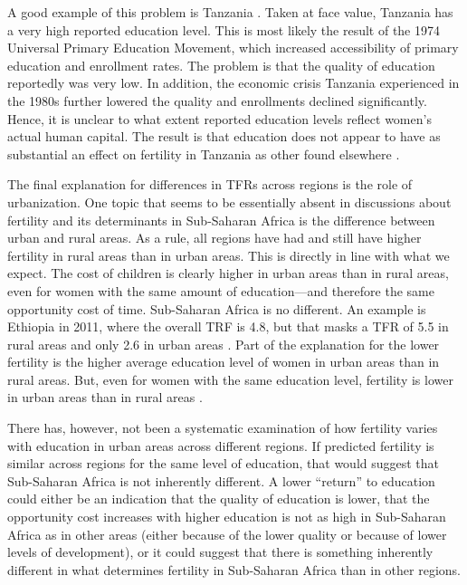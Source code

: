 \documentclass[]{article}
\begin{document}
A good example of this problem is Tanzania \citep{Galabawa2001,Wedgwood2005}. Taken at face value, Tanzania has a very high reported education level. This is most likely the result of the 1974 Universal Primary Education Movement, which increased accessibility of primary education and enrollment rates. The problem is that the quality of education reportedly was very low. In addition, the economic crisis Tanzania experienced in the 1980s further lowered the quality and enrollments declined significantly. Hence, it is unclear to what extent reported education levels reflect women's actual human capital. The result is that education does not appear to have as substantial an effect on fertility in Tanzania as other found elsewhere \citet{Alam2016}.

The final explanation for differences in TFRs across regions is the role of urbanization. One topic that seems to be essentially absent in discussions about fertility and its determinants in Sub-Saharan Africa is the difference between urban and rural areas. As a rule, all regions have had and still have higher fertility in rural areas than in urban areas. This is directly in line with what we expect. The cost of children is clearly higher in urban areas than in rural areas, even for women with the same amount of education---and therefore the same opportunity cost of time. Sub-Saharan Africa is no different. An example is Ethiopia in 2011, where the overall TRF is 4.8, but that masks a TFR of 5.5 in rural areas and only 2.6 in urban areas \citep{Central-Statistical-Agency/Ethiopia2012}. Part of the explanation for the lower fertility is the higher average education level of women in urban areas than in rural areas. But, even for women with the same education level, fertility is lower in urban areas than in rural areas \citep{Ainsworth1996}.

There has, however, not been a systematic examination of how fertility varies with education in urban areas across different regions. If predicted fertility is similar across regions for the same level of education, that would suggest that Sub-Saharan Africa is not inherently different. A lower ``return'' to education could either be an indication that the quality of education is lower, that the opportunity cost increases with higher education is not as high in Sub-Saharan Africa as in other areas (either because of the lower quality or because of lower levels of development), or it could suggest that there is something inherently different in what determines fertility in Sub-Saharan Africa than in other regions.
\end{document}
